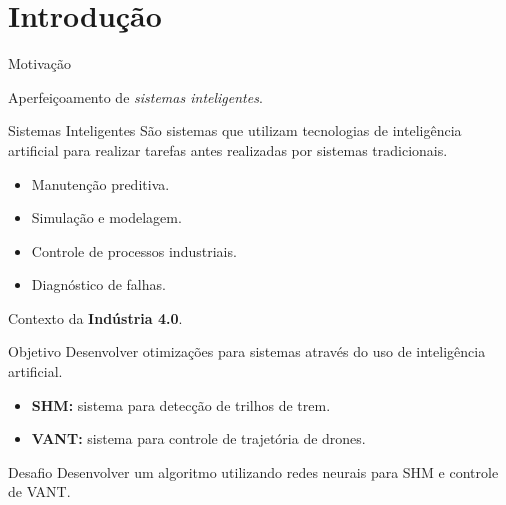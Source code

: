 \section{Introdução}

\begin{frame}{Motivação}

Aperfeiçoamento de \emph{sistemas inteligentes}. \pause

\begin{block}{Sistemas Inteligentes}
    São sistemas que utilizam tecnologias de inteligência artificial para realizar tarefas antes realizadas por sistemas tradicionais.
\end{block} \pause

    \begin{itemize}
        \item Manutenção preditiva.
        \item Simulação e modelagem.
        \item Controle de processos industriais.
        \item Diagnóstico de falhas.
    \end{itemize} \pause

\alert{Contexto da \textbf{Indústria 4.0}.}
\end{frame}

\begin{frame}{Objetivo}
Desenvolver otimizações para sistemas através do uso de inteligência artificial. \pause

\begin{itemize}
    \item \textbf{SHM:} sistema para detecção de trilhos de trem. 
    \item \textbf{VANT:} sistema para controle de trajetória de drones.
\end{itemize} \pause

\begin{block}{Desafio}
    Desenvolver um algoritmo utilizando redes neurais para SHM e controle de VANT.
\end{block}
\end{frame} 




